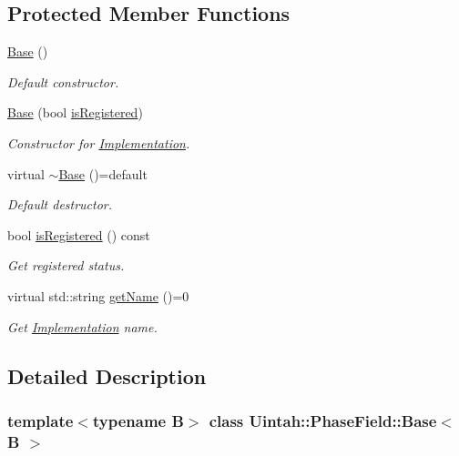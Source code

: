 \subsection*{Protected Member Functions}
\begin{DoxyCompactItemize}
\item 
\hyperlink{classUintah_1_1PhaseField_1_1Base_af64dc0e6053ade056af9806edce1d852}{Base} ()
\begin{DoxyCompactList}\small\item\em Default constructor. \end{DoxyCompactList}\item 
\hyperlink{classUintah_1_1PhaseField_1_1Base_a282bf8678ac00386cdd0b4b6b347d516}{Base} (bool \hyperlink{classUintah_1_1PhaseField_1_1Base_aead016aeee1f43fb7959158d7c9edb31}{is\+Registered})
\begin{DoxyCompactList}\small\item\em Constructor for \hyperlink{classUintah_1_1PhaseField_1_1Implementation}{Implementation}. \end{DoxyCompactList}\item 
virtual \hyperlink{classUintah_1_1PhaseField_1_1Base_a6c584b6c9a0a40c98870e6a25311fbff}{$\sim$\+Base} ()=default
\begin{DoxyCompactList}\small\item\em Default destructor. \end{DoxyCompactList}\item 
bool \hyperlink{classUintah_1_1PhaseField_1_1Base_aead016aeee1f43fb7959158d7c9edb31}{is\+Registered} () const
\begin{DoxyCompactList}\small\item\em Get registered status. \end{DoxyCompactList}\item 
virtual std\+::string \hyperlink{classUintah_1_1PhaseField_1_1Base_acd19fa2507f239588926b04069ad1b73}{get\+Name} ()=0
\begin{DoxyCompactList}\small\item\em Get \hyperlink{classUintah_1_1PhaseField_1_1Implementation}{Implementation} name. \end{DoxyCompactList}\end{DoxyCompactItemize}


\subsection{Detailed Description}
\subsubsection*{template$<$typename B$>$\newline
class Uintah\+::\+Phase\+Field\+::\+Base$<$ B $>$}

